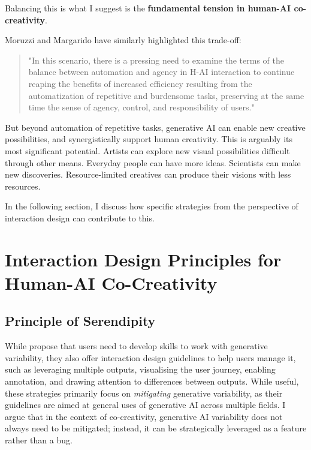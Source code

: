 Balancing this is what I suggest is the \textbf{fundamental tension in human-AI co-creativity}.

Moruzzi and Margarido \cite{Moruzzi2024-cq} have similarly highlighted this trade-off:

\begin{quote}
    "In this scenario, there is a pressing need to examine the terms of the balance between automation and agency in H-AI interaction to continue reaping the benefits of increased efficiency resulting from the automatization of repetitive and burdensome tasks, preserving at the same time the sense of agency, control, and responsibility of users."
\end{quote}

But beyond automation of repetitive tasks, generative AI can enable new creative possibilities, and synergistically support human creativity. This is arguably its most significant potential. Artists can explore new visual possibilities difficult through other means. Everyday people can have more ideas. Scientists can make new discoveries. Resource-limited creatives can produce their visions with less resources.

In the following section, I discuss how specific strategies from the perspective of interaction design can contribute to this. 

\section{Interaction Design Principles for Human-AI Co-Creativity}

\subsection{Principle of Serendipity}

While \cite{Weisz2024-io} propose that users need to develop skills to work with generative variability, they also offer interaction design guidelines to help users manage it, such as leveraging multiple outputs, visualising the user journey, enabling annotation, and drawing attention to differences between outputs. While useful, these strategies primarily focus on \textit{mitigating} generative variability, as their guidelines are aimed at general uses of generative AI across multiple fields. I argue that in the context of co-creativity, generative AI variability does not always need to be mitigated; instead, it can be strategically leveraged as a feature rather than a bug.

